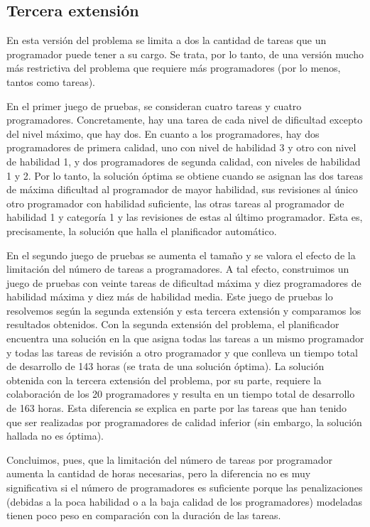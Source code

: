 
\subsection{Tercera extensión} \label{sec:res-ext3}

En esta versión del problema se limita a dos la cantidad de tareas que un 
programador puede tener a su cargo. Se trata, por lo tanto, de una versión 
mucho más restrictiva del problema que requiere más programadores (por lo 
menos, tantos como tareas). 

En el primer juego de pruebas, se consideran cuatro tareas y cuatro 
programadores. Concretamente, hay una tarea de cada nivel de dificultad 
excepto del nivel máximo, que hay dos. En cuanto a los programadores, hay 
dos programadores de primera calidad, uno con nivel de habilidad 3 y otro 
con nivel de habilidad 1, y dos programadores de segunda calidad, con niveles 
de habilidad 1 y 2. Por lo tanto, la solución óptima se obtiene cuando se 
asignan las dos tareas de máxima dificultad al programador de mayor 
habilidad, sus revisiones al único otro programador con habilidad suficiente,
las otras tareas al programador de habilidad 1 y categoría 1 y las revisiones 
de estas al último programador. Esta es, precisamente, la solución que halla 
el planificador automático.

En el segundo juego de pruebas se aumenta el tamaño y se valora el efecto de 
la limitación del número de tareas a programadores. A tal efecto, construimos 
un juego de pruebas con veinte tareas de dificultad máxima y diez 
programadores de habilidad máxima y diez más de habilidad media. Este juego 
de pruebas lo resolvemos según la segunda extensión y esta tercera extensión 
y comparamos los resultados obtenidos. Con la segunda extensión del problema, 
el planificador encuentra una solución en la que asigna todas las tareas a un 
mismo programador y todas las tareas de revisión a otro programador y que 
conlleva un tiempo total de desarrollo de 143 horas (se trata de una solución 
óptima). La solución obtenida con la tercera extensión del problema, por su 
parte, requiere la colaboración de los 20 programadores y resulta en un 
tiempo total de desarrollo de 163 horas. Esta diferencia se explica en parte 
por las tareas que han tenido que ser realizadas por programadores de calidad 
inferior (sin embargo, la solución hallada no es óptima). 

Concluimos, pues, que la limitación del número de tareas por programador 
aumenta la cantidad de horas necesarias, pero la diferencia no es muy 
significativa si el número de programadores es suficiente porque las
penalizaciones (debidas a la poca habilidad o a la baja calidad de los 
programadores) modeladas tienen poco peso en comparación con la duración de 
las tareas.



